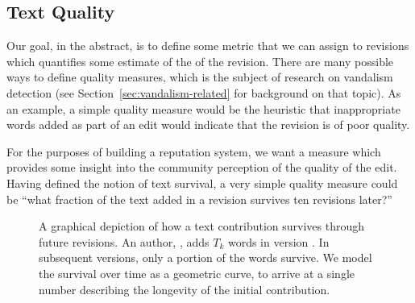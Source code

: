 \subsection{Text Quality}

Our goal, in the abstract, is to define some metric that we can assign to
revisions which quantifies some estimate of the  of the
revision.
There are many possible ways to define quality measures, which is the
subject of research on vandalism detection (see
Section~\ref{sec:vandalism-related} for background on that topic).
As an example, a simple quality measure would be the heuristic that
inappropriate words added as part of an edit would indicate that the revision
is of poor quality.

For the purposes of building a reputation system, we want a measure
which provides some insight into the community perception of the
quality of the edit.
Having defined the notion of text survival, a very simple quality measure
could be ``what fraction of the text added in a revision survives
ten revisions later?''



\begin{figure}[t]
\centering
{}
\hspace{1ex}
\caption{A graphical depiction of how a text contribution survives
	through future revisions.
	An author, , adds $T_k$ words in version .
	In subsequent versions, only a portion of the words survive.
	We model the survival over time as a geometric curve,
	to arrive at a single number describing the longevity
	of the initial contribution.}
\label{fig-textsurvival}
\end{figure}


